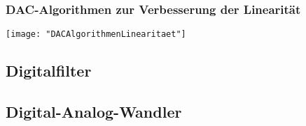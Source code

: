 \subsubsection{DAC-Algorithmen zur Verbesserung der Linearität}
\begin{minipage}[t]{0.3\textwidth}
	\vspace{0pt}
	\texttt{[image: "DACAlgorithmenLinearitaet"]}
\end{minipage}\hspace{0.05\textwidth}
\begin{minipage}[t]{0.3\textwidth}
	\vspace{0pt}
	
\end{minipage}\hspace{0.05\textwidth}
\begin{minipage}[t]{0.3\textwidth}
	\vspace{0pt}
	
\end{minipage}
\vspace{2mm}


\subsection{Digitalfilter}

\subsection{Digital-Analog-Wandler}